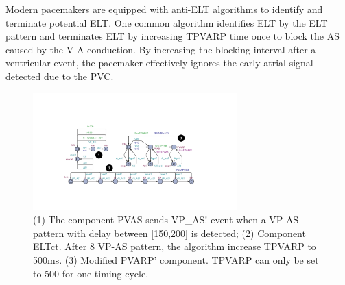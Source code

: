 Modern pacemakers are equipped with anti-ELT algorithms to identify and terminate potential ELT. One common algorithm identifies ELT by the ELT pattern and terminates ELT by increasing TPVARP time once to block the AS caused by the V-A conduction. By increasing the blocking interval after a ventricular event, the pacemaker effectively ignores the early atrial signal detected due to the PVC.
\begin{figure}
		\centering
		\includegraphics[width=0.7\textwidth]{figs/ELT_count.pdf}
		\caption{\small (1) The component \textsf{PVAS} sends \textsf{VP\_AS!} event when a VP-AS pattern with delay between [150,200] is detected; (2) Component \textsf{ELTct}. After 8 VP-AS pattern, the algorithm increase TPVARP to 500ms. (3) Modified \textsf{PVARP'} component. TPVARP can only be set to 500 for one timing cycle.}
		\label{fig:ELT_count}
\end{figure}
%
